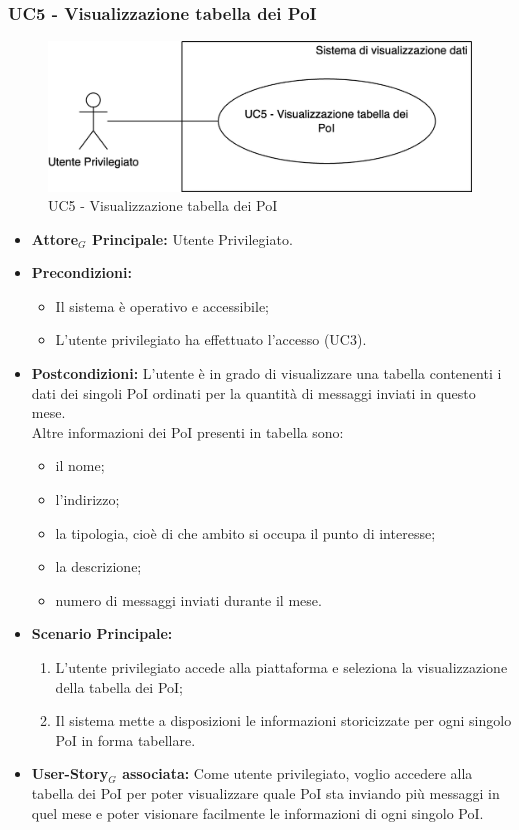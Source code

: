 \documentclass[11pt]{article}
\begin{document}
\begin{justify}
\subsubsection{\textbf{UC5 - Visualizzazione tabella dei PoI}}
\begin{figure}[H]
    \centering
    \includegraphics[width=0.7\linewidth]{UC5image.png}
    \caption{UC5 - Visualizzazione tabella dei PoI}
    \label{fig:UC5}
\end{figure}
\label{UC5}
\begin{itemize}
    \item \textbf{Attore$_G$ Principale:} Utente Privilegiato.
    \item \textbf{Precondizioni:} 
        \begin{itemize}
          \item Il sistema è operativo e accessibile;
            \item L'utente privilegiato ha effettuato l'accesso (UC3).
        \end{itemize}
      \item \textbf{Postcondizioni:} L'utente è in grado di visualizzare una tabella contenenti i dati dei singoli PoI ordinati per la quantità di messaggi inviati in questo mese.\\
        Altre informazioni dei PoI presenti in tabella sono:
        \begin{itemize}
       \item il nome;
       \item l'indirizzo;
       \item la tipologia, cioè di che ambito si occupa il punto di interesse;
       \item la descrizione;
         \item numero di messaggi inviati durante il mese.
        \end{itemize}
    \item \textbf{Scenario Principale:} 
        \begin{enumerate}
        \item L'utente privilegiato accede alla piattaforma e seleziona la visualizzazione della tabella dei PoI;
          \item Il sistema mette a disposizioni le informazioni storicizzate per ogni singolo PoI in forma tabellare.
        \end{enumerate}
    \item \textbf{User-Story$_G$ associata:} Come utente privilegiato, voglio accedere alla tabella dei PoI per poter visualizzare quale PoI sta inviando più messaggi in quel mese e poter visionare facilmente le informazioni di ogni singolo PoI.
\end{itemize}


\end{justify}
\end{document}

